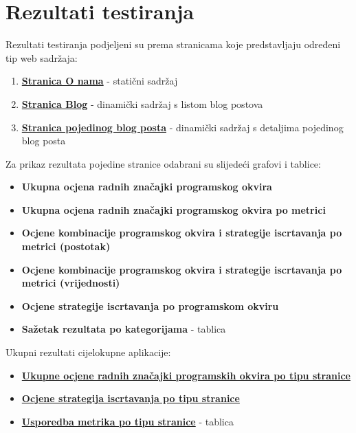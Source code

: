 \section{Rezultati testiranja}
Rezultati testiranja podjeljeni su prema stranicama koje predstavljaju određeni tip web sadržaja:

\begin{enumerate}
    \item \hyperref[sec:rezultati-o-nama]{\textbf{Stranica O nama}} - statični sadržaj
    \item \hyperref[sec:rezultati-blog]{\textbf{Stranica Blog}} - dinamički sadržaj s listom blog postova
    \item \hyperref[sec:rezultati-blog-post]{\textbf{Stranica pojedinog blog posta}} - dinamički sadržaj s detaljima pojedinog blog posta
\end{enumerate}

\bigskip
\noindent
Za prikaz rezultata pojedine stranice odabrani su slijedeći grafovi i tablice:

\begin{itemize}
    \item \textbf{Ukupna ocjena radnih značajki programskog okvira}
    \item \textbf{Ukupna ocjena radnih značajki programskog okvira po metrici}
    \item \textbf{Ocjene kombinacije programskog okvira i strategije iscrtavanja po metrici (postotak)}
    \item \textbf{Ocjene kombinacije programskog okvira i strategije iscrtavanja po metrici (vrijednosti)}
    \item \textbf{Ocjene strategije iscrtavanja po programskom okviru}
    \item \textbf{Sažetak rezultata po kategorijama} - tablica
\end{itemize}

\bigskip
\noindent
Ukupni rezultati cijelokupne aplikacije:

\begin{itemize}
    \item \hyperref[fig:ukupne_ocjene_radnih_znacajki]{\textbf{Ukupne ocjene radnih značajki programskih okvira po tipu stranice}}
    \item \hyperref[fig:ukupne_ocjene_strategija_iscrtavanja]{\textbf{Ocjene strategija iscrtavanja po tipu stranice}}
    \item \hyperref[tab:usporedba_metrika_po_tipu_stranice]{\textbf{Usporedba metrika po tipu stranice}} - tablica
\end{itemize}

